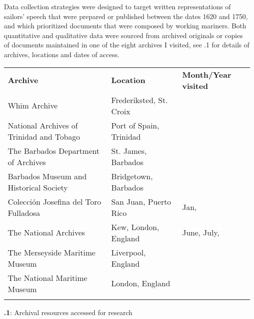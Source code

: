 Data collection strategies were designed to target written representations of sailors’ speech that were prepared or published between the dates 1620 and 1750, and which prioritized documents that were composed by working mariners. Both quantitative and qualitative data were sourced from archived originals or copies of documents maintained in one of the eight archives I visited, see .1 for details of archives, locations and dates of access.


\begin{tabularx}{\textwidth}{XXX}
\lsptoprule

\textbf{Archive} & \textbf{Location} & \textbf{Month/Year} \textbf{visited}\\
Whim Archive & Frederiksted, St. Croix & \citealt{May2010}\\
National Archives of Trinidad and Tobago & Port of Spain, Trinidad & \citealt{July2012}\\
The Barbados Department of Archives & St. James, Barbados & \citealt{July2013}\\
Barbados Museum and Historical Society & Bridgetown, Barbados & \citealt{July2013}\\
Colección Josefina del Toro Fulladosa & San Juan, Puerto Rico & Jan, \citealt{Feb2014}\\
The National Archives & Kew, London, England & June, July, \citealt{Nov2015}\\
The Merseyside Maritime Museum & Liverpool, England & \citealt{July2015}\\
The National Maritime Museum & London, England & \citealt{November2015}\\
\lspbottomrule
\end{tabularx}

\textbf{.1}: Archival resources accessed for research



